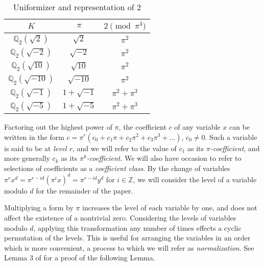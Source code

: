 \documentclass[12pt]{amsart}
\begin{document}
\begin{table}[]
    \label{fields}
    \caption{Uniformizer and representation of 2}
    \centering
    \begin{tabular}{|c|c|c|}
        \hline 
         $K$ & $\pi$ & $2 \pmod{\pi^4}$ \rule{0pt}{2.6ex} \\
         \hline
         \rule{0pt}{2.6ex} \rule[-0.9ex]{0pt}{0pt}
         $\mathbb{Q}_2(\sqrt{2})$ & $\sqrt{2}$ & $\pi^2$ \rule{0pt}{2.6ex} \rule[-0.9ex]{0pt}{0pt}\\
         \hline
         $\mathbb{Q}_2(\sqrt{-2})$ & $\sqrt{-2}$ & $\pi^2$ \rule{0pt}{2.6ex} \\
         \hline
         $\mathbb{Q}_2(\sqrt{10})$ & $\sqrt{10}$ & $\pi^2$ \rule{0pt}{2.6ex} \\
         \hline
         $\mathbb{Q}_2(\sqrt{-10})$ & $\sqrt{-10}$ & $\pi^2$ \rule{0pt}{2.6ex} \\
         \hline
         $\mathbb{Q}_2(\sqrt{-1})$ & $1 + \sqrt{-1}$ & $\pi^2 + \pi^3$ \rule{0pt}{2.6ex} \\
         \hline
         $\mathbb{Q}_2(\sqrt{-5})$ & $1 + \sqrt{-5}$ & $\pi^2 + \pi^3$ \rule{0pt}{2.6ex} \\
         \hline
    \end{tabular}
\end{table}

Factoring out the highest power of $\pi$, the coefficient $c$ of any variable $x$ can be written in the form $c = \pi^r(c_0 + c_1\pi + c_2\pi^2 + c_3\pi^3 + \ldots)$, $c_0 \neq 0$.  Such a variable is said to be at \textit{level $r$}, and we will refer to the value of $c_1$ as its \textit{$\pi$-coefficient}, and more generally $c_k$ as its \textit{$\pi^k$-coefficient}.  We will also have occasion to refer to selections of coefficients as a \textit{coefficient class}.  By the change of variables $\pi^r x^d = \pi^{r-id}(\pi^i x)^d = \pi^{r-id}y^d$ for $i \in \mathbb{Z}$, we will consider the level of a variable modulo $d$ for the remainder of the paper.

Multiplying a form by $\pi$ increases the level of each variable by one, and does not affect the existence of a nontrivial zero.  Considering the levels of variables modulo $d$, applying this transformation any number of times effects a cyclic permutation of the levels.  This is useful for arranging the variables in an order which is more convenient, a process to which we will refer as \textit{normalization}. See Lemma 3 of \cite{davenport1963homogeneous} for a proof of the following Lemma.
\end{document}
